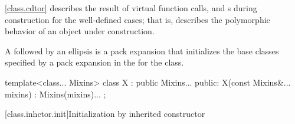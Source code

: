 \pnum
\begin{note}
\ref{class.cdtor} describes the result of virtual function calls,
and
s
during construction for the well-defined cases;
that is, describes the polymorphic behavior
of an object under construction.
\end{note}

\pnum
{}%
A  followed by an ellipsis is
a pack expansion that initializes the base
classes specified by a pack expansion in the 
for the class.
\begin{example}
\begin{codeblock}
template<class... Mixins>
class X : public Mixins... {
public:
  X(const Mixins&... mixins) : Mixins(mixins)... { }
};
\end{codeblock}
\end{example}

[class.inhctor.init]{Initialization by inherited constructor}%

